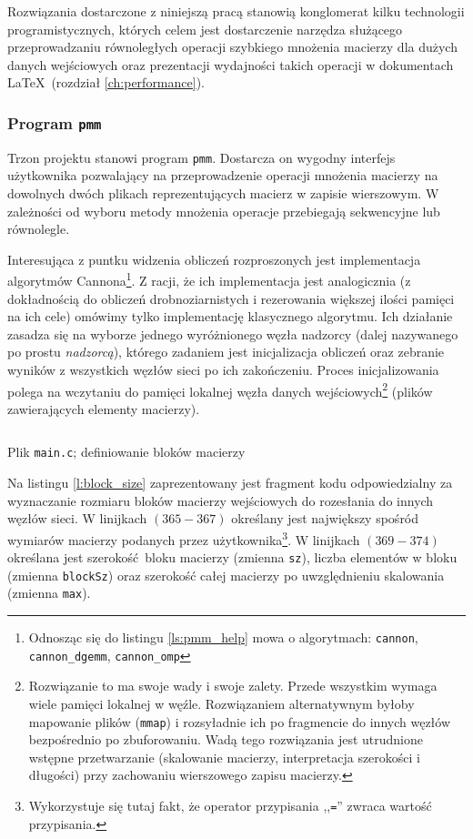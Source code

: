 Rozwiązania dostarczone z niniejszą pracą stanowią konglomerat kilku technologii programistycznych, których celem jest dostarczenie narzędza służącego przeprowadzaniu równoległych operacji szybkiego mnożenia macierzy dla dużych danych wejściowych oraz prezentacji wydajności takich operacji w dokumentach \LaTeX \, (rozdział \ref{ch:performance}). 

\subsubsection{Program \texttt{pmm}}

Trzon projektu stanowi program \texttt{pmm}. Dostarcza on wygodny interfejs użytkownika pozwalający na przeprowadzenie operacji mnożenia macierzy na dowolnych dwóch plikach reprezentujących macierz w zapisie wierszowym. W zależności od wyboru metody mnożenia operacje przebiegają sekwencyjne lub równolegle.

Interesująca z puntku widzenia obliczeń rozproszonych jest implementacja algorytmów Cannona\footnote{Odnosząc się do listingu \ref{ls:pmm_help} mowa o algorytmach: \texttt{cannon}, \texttt{cannon\_dgemm}, \texttt{cannon\_omp}}. Z racji, że ich implementacja jest analogicznia (z dokładnością do obliczeń drobnoziarnistych i rezerowania większej ilości pamięci na ich cele) omówimy tylko implementację klasycznego algorytmu. Ich działanie zasadza się na wyborze jednego wyróżnionego węzła nadzorcy (dalej nazywanego po prostu \emph{nadzorcą}), którego zadaniem jest inicjalizacja obliczeń oraz zebranie wyników z wszystkich węzłów sieci po ich zakończeniu. Proces inicjalizowania polega na wczytaniu do pamięci lokalnej węzła danych wejściowych\footnote{Rozwiązanie to ma swoje wady i swoje zalety. Przede wszystkim wymaga wiele pamięci lokalnej w węźle. Rozwiązaniem alternatywnym byłoby mapowanie plików (\texttt{mmap}) i rozsyładnie ich po fragmencie do innych węzłów bezpośrednio po zbuforowaniu. Wadą tego rozwiązania jest utrudnione wstępne przetwarzanie (skalowanie macierzy, interpretacja szerokości i długości) przy zachowaniu wierszowego zapisu macierzy.} (plików zawierających elementy macierzy). 

\begin{listing}[H]
\inputminted[fontsize=\footnotesize,bgcolor=bg,linenos,firstnumber=365,firstline=365,lastline=377]{c}{includes/listings/main.c}
\caption{Plik \texttt{main.c}; definiowanie bloków macierzy}
\label{l:block_size}
\end{listing}

Na listingu \ref{l:block_size} zaprezentowany jest fragment kodu odpowiedzialny za wyznaczanie rozmiaru bloków macierzy wejściowych do rozesłania do innych węzłów sieci. W linijkach \((365-367)\) określany jest największy spośród wymiarów macierzy podanych przez użytkownika\footnote{Wykorzystuje się tutaj fakt, że operator przypisania ,,\texttt{=}'' zwraca wartość przypisania.}. W linijkach \((369-374)\) określana jest szerokość bloku macierzy (zmienna \texttt{sz}), liczba elementów w bloku (zmienna \texttt{blockSz}) oraz szerokość całej macierzy po uwzględnieniu skalowania (zmienna \texttt{max}).

